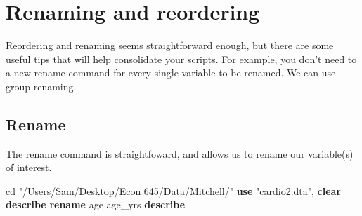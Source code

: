 \documentclass[
]{book}
\newenvironment{Shaded}{\begin{snugshade}}{\end{snugshade}}
\newcommand{\KeywordTok}[1]{\textcolor[rgb]{0.13,0.29,0.53}{\textbf{#1}}}
\newcommand{\NormalTok}[1]{#1}
\newcommand{\StringTok}[1]{\textcolor[rgb]{0.31,0.60,0.02}{#1}}
\begin{document}
\section{Renaming and reordering}\label{renaming-and-reordering}

Reordering and renaming seems straightforward enough, but there are some useful tips that will help consolidate your scripts. For example, you don't need to a new rename command for every single variable to be renamed. We can use group renaming.

\subsection{Rename}\label{rename}

The rename command is straightfoward, and allows us to rename
our variable(s) of interest.

\begin{Shaded}
\begin{Highlighting}[]
\NormalTok{cd }\StringTok{"/Users/Sam/Desktop/Econ 645/Data/Mitchell/"}
\KeywordTok{use} \StringTok{"cardio2.dta"}\NormalTok{, }\KeywordTok{clear}
\KeywordTok{describe}
\KeywordTok{rename}\NormalTok{ age age\_yrs}
\KeywordTok{describe}
\end{Highlighting}
\end{Shaded}
\end{document}
